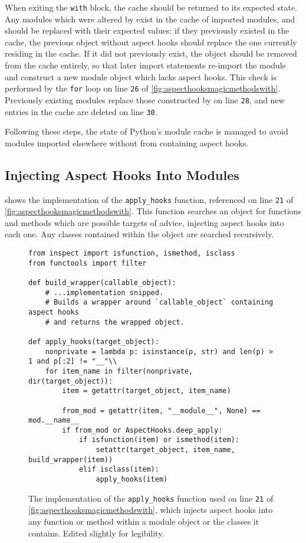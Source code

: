 When exiting the \lstinline{with} block, the cache should be returned to its
expected state. Any modules which were altered by \pdsf{} exist in the cache of
imported modules, and should be replaced with their expected values: if they
previously existed in the cache, the previous object without aspect hooks should
replace the one currently residing in the cache. If it did not previously exist,
the object should be removed from the cache entirely, so that later import
statements re-import the module and construct a new module object which lacks
aspect hooks. This check is performed by the \lstinline{for} loop on line
\texttt{26} of \cref{fig:aspecthooksmagicmethodswith}. Previously existing
modules replace those constructed by \pdsf{} on line \texttt{28}, and new
entries in the cache are deleted on line \texttt{30}.

Following these steps, the state of Python's module cache is managed to avoid
modules imported elsewhere without \pdsf{} from containing aspect hooks.

\subsection{Injecting Aspect Hooks Into Modules}
\label{injecting_aspect_hooks_when_importing}

 shows the implementation of the
\lstinline{apply_hooks} function, referenced on line \texttt{21} of
\cref{fig:aspecthooksmagicmethodswith}. This function searches an
object for functions and methods which are possible targets of advice, injecting
aspect hooks into each one. Any classes contained within the object are searched
recursively.

\begin{figure}
    \centering
    \begin{lstlisting}[style=small_python]
from inspect import isfunction, ismethod, isclass
from functools import filter

def build_wrapper(callable_object):
    # ...implementation snipped.
    # Builds a wrapper around `callable_object` containing aspect hooks
    # and returns the wrapped object.

def apply_hooks(target_object):
    nonprivate = lambda p: isinstance(p, str) and len(p) > 1 and p[:2] != "__"\\
    for item_name in filter(nonprivate, dir(target_object)):
        item = getattr(target_object, item_name)

        from_mod = getattr(item, "__module__", None) == mod.__name__
        if from_mod or AspectHooks.deep_apply:
            if isfunction(item) or ismethod(item):
                setattr(target_object, item_name, build_wrapper(item))
            elif isclass(item):
                apply_hooks(item)
    \end{lstlisting}
    \caption{The implementation of the \lstinline{apply_hooks} function used on
    line \texttt{21} of \cref{fig:aspecthooksmagicmethodswith}, which injects
    aspect hooks into any function or method within a module object or the
    classes it contains. Edited slightly for legibility.}
    \label{fig:apply_hooks_to_module}
\end{figure}

